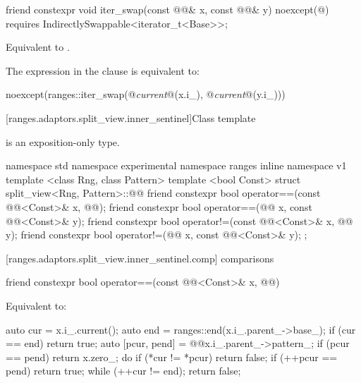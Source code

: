 %
\begin{itemdecl}
friend constexpr void iter_swap(const @@& x, const @@& y)
noexcept(@\seebelow@) requires IndirectlySwappable<iterator_t<Base>>;
\end{itemdecl}

\begin{itemdescr}
\pnum
\effects Equivalent to .

\pnum
\remarks The expression in the  clause is equivalent to:
\begin{codeblock}
noexcept(ranges::iter_swap(@\textit{current}@(x.i_), @\textit{current}@(y.i_)))
\end{codeblock}
\end{itemdescr}

[ranges.adaptors.split_view.inner_sentinel]{Class template }

\pnum
\enternote {} is an exposition-only type.\exitnote

\begin{codeblock}
namespace std { namespace experimental { namespace ranges { inline namespace v1 {
  template <class Rng, class Pattern>
  template <bool Const>
  struct split_view<Rng, Pattern>::@@ {
    friend constexpr bool operator==(const @@<Const>& x, @@);
    friend constexpr bool operator==(@@ x, const @@<Const>& y);
    friend constexpr bool operator!=(const @@<Const>& x, @@ y);
    friend constexpr bool operator!=(@@ x, const @@<Const>& y);
  };
}}}}
\end{codeblock}

[ranges.adaptors.split_view.inner_sentinel.comp]{ comparisons}

%
\begin{itemdecl}
friend constexpr bool operator==(const @@<Const>& x, @@)
\end{itemdecl}

\begin{itemdescr}
\pnum
\effects Equivalent to:
\begin{codeblock}
auto cur = x.i_.current();
auto end = ranges::end(x.i_.parent_->base_);
if (cur == end) return true;
auto [pcur, pend] = @@{x.i_.parent_->pattern_};
if (pcur == pend) return x.zero_;
do {
  if (*cur != *pcur) return false;
  if (++pcur == pend) return true;
} while (++cur != end);
return false;
\end{codeblock}
\end{itemdescr}

